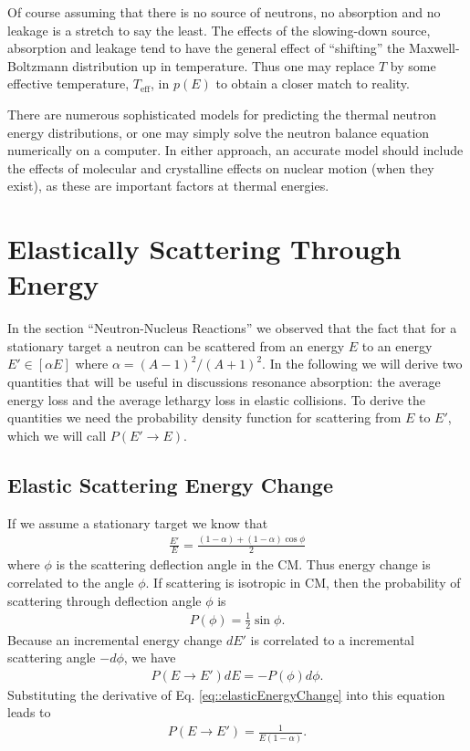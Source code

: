 \documentclass[11pt]{article}
\begin{document}
Of course assuming that there is no source of neutrons, no absorption and no leakage is a stretch to say the least.  The effects of the slowing-down source, absorption and leakage tend to have the general effect of ``shifting'' the Maxwell-Boltzmann distribution up in temperature.  Thus one may replace \(T\) by some effective temperature, \(T_{\text{eff}}\), in \(p(E)\) to obtain a closer match to reality.

There are numerous sophisticated models for predicting the thermal neutron energy distributions, or one may simply solve the neutron balance equation numerically on a computer.  In either approach, an accurate model should include the effects of molecular and crystalline effects on nuclear motion (when they exist), as these are important factors at thermal energies.
\section{Elastically Scattering Through Energy}
\label{sec:orgheadline9}
In the section ``Neutron-Nucleus Reactions'' we observed that the fact that for a stationary target a neutron can be scattered from an energy \(E\) to an energy \(E' \in [\alpha E]\) where \(\alpha = (A-1)^2/(A+1)^2\).  In the following we will derive two quantities that will be useful in discussions resonance absorption: the average energy loss and the average lethargy loss in elastic collisions.  To derive the quantities we need the probability density function for scattering from \(E\) to \(E'\), which we will call \(P(E' \rightarrow E)\).

\subsection{Elastic Scattering Energy Change}
\label{sec:orgheadline6}
If we assume a stationary target we know that
\begin{align}
  \label{eq::elasticEnergyChange}
  \frac{E'}{E} = \frac{(1-\alpha) + (1-\alpha) \cos\phi}{2}
\end{align}
where \(\phi\) is the scattering deflection angle in the CM.  Thus energy change is correlated to the angle \(\phi\).  If scattering is isotropic in CM, then the probability of scattering through deflection angle \(\phi\) is
\begin{align}
  P(\phi) = \frac{1}{2}\sin\phi.
\end{align}
Because an incremental energy change \(dE'\) is correlated to a incremental scattering angle \(-d\phi\), we have
\begin{align}
  P(E \rightarrow E') dE = -P(\phi) d\phi.
\end{align}
Substituting the derivative of Eq. \eqref{eq::elasticEnergyChange} into this equation leads to
\begin{align}
  P(E \rightarrow E') = \frac{1}{E(1-\alpha)}.
\end{align}
\end{document}
